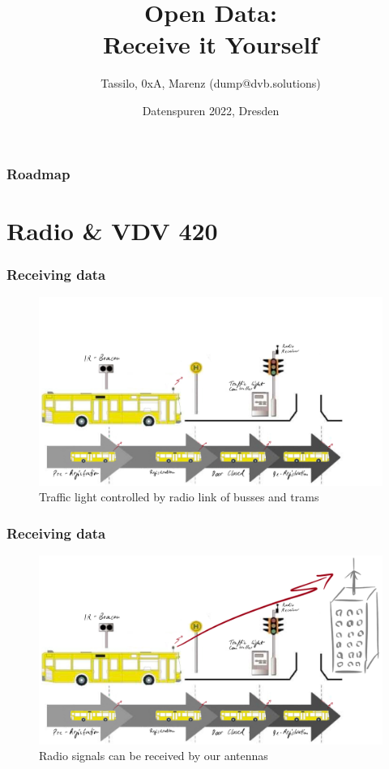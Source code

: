 \documentclass[aspectratio=169]{beamer}
\title{Open Data: \\ Receive it Yourself}
\date[ISPN ’80]{Datenspuren 2022, Dresden}
\author[]{Tassilo, 0xA, Marenz (dump@dvb.solutions)}
\begin{document}
\begin{frame}\titlepage
\end{frame}
  
\begin{frame} 
\frametitle{Roadmap} 

\tableofcontents

\end{frame}

\section{Radio \& VDV 420}


\begin{frame}
\frametitle{Receiving data}
\begin{figure}
\centering
\includegraphics[height=0.65\textheight]{figs/lsa-beeinflussungs-stecke.pdf}
\caption{Traffic light controlled by radio link of busses and trams}
\end{figure}
\end{frame}


\begin{frame}
\frametitle{Receiving data}
\begin{figure}
\centering
\includegraphics[height=0.65\textheight]{figs/lsa-beeinflussungs-stecke-mit-antenne.pdf}
\caption{Radio signals can be received by our antennas}
\end{figure}
\end{frame}
\end{document}
